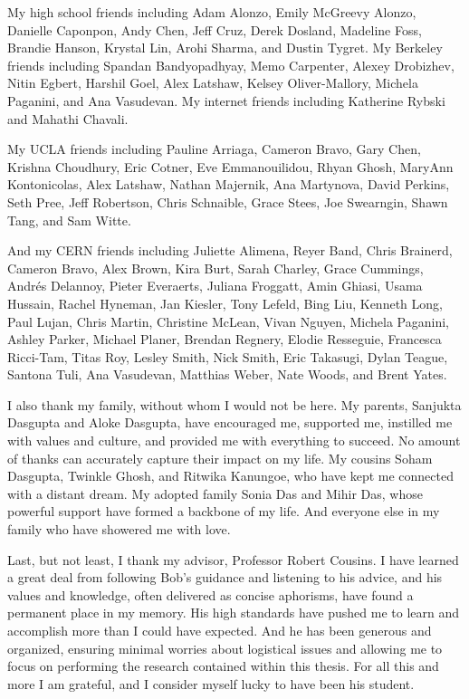 My high school friends including
Adam Alonzo,
Emily McGreevy Alonzo,
Danielle Caponpon,
Andy Chen,
Jeff Cruz,
Derek Dosland,
Madeline Foss,
Brandie Hanson,
Krystal Lin,
Arohi Sharma,
and
Dustin Tygret.
My Berkeley friends including
Spandan Bandyopadhyay,
Memo Carpenter,
Alexey Drobizhev,
Nitin Egbert,
Harshil Goel,
Alex Latshaw,
Kelsey Oliver-Mallory,
Michela Paganini,
and
Ana Vasudevan.
My internet friends including Katherine Rybski and Mahathi Chavali.

My UCLA friends including
Pauline Arriaga,
Cameron Bravo,
Gary Chen,
Krishna Choudhury,
Eric Cotner,
Eve Emmanouilidou,
Rhyan Ghosh,
MaryAnn Kontonicolas,
Alex Latshaw,
Nathan Majernik,
Ana Martynova,
David Perkins,
Seth Pree,
Jeff Robertson,
Chris Schnaible,
Grace Stees,
Joe Swearngin,
Shawn Tang,
and
Sam Witte.

And my CERN friends including
Juliette Alimena,
Reyer Band,
Chris Brainerd,
Cameron Bravo,
Alex Brown,
Kira Burt,
Sarah Charley,
Grace Cummings,
Andr\'{e}s Delannoy,
Pieter Everaerts,
Juliana Froggatt,
Amin Ghiasi,
Usama Hussain,
Rachel Hyneman,
Jan Kiesler,
Tony Lefeld,
Bing Liu,
Kenneth Long,
Paul Lujan,
Chris Martin,
Christine McLean,
Vivan Nguyen,
Michela Paganini,
Ashley Parker,
Michael Planer,
Brendan Regnery,
Elodie Resseguie,
Francesca Ricci-Tam,
Titas Roy,
Lesley Smith,
Nick Smith,
Eric Takasugi,
Dylan Teague,
Santona Tuli,
Ana Vasudevan,
Matthias Weber,
Nate Woods,
and
Brent Yates.

I also thank my family, without whom I would not be here. My parents, Sanjukta Dasgupta and Aloke Dasgupta, have encouraged me, supported me, instilled me with values and culture, and provided me with everything to succeed. No amount of thanks can accurately capture their impact on my life. My cousins Soham Dasgupta, Twinkle Ghosh, and Ritwika Kanungoe, who have kept me connected with a distant dream. My adopted family Sonia Das and Mihir Das, whose powerful support have formed a backbone of my life. And everyone else in my family who have showered me with love.

Last, but not least, I thank my advisor, Professor Robert Cousins.
I have learned a great deal from following Bob's guidance and listening to his advice, and his values and knowledge, often delivered as concise aphorisms, have found a permanent place in my memory.
His high standards have pushed me to learn and accomplish more than I could have expected.
And he has been generous and organized, ensuring minimal worries about logistical issues and allowing me to focus on performing the research contained within this thesis.
For all this and more I am grateful, and I consider myself lucky to have been his student.
